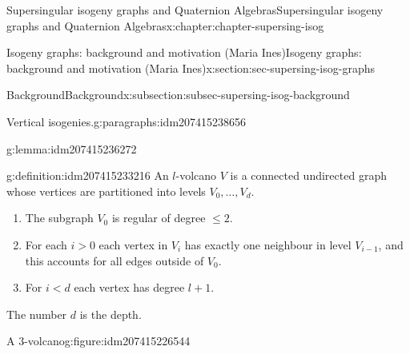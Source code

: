 \documentclass[oneside,10pt,]{book}
\numberwithin{equation}{section}
\newcommand{\lt}{<}
\newcommand{\gt}{>}
\begin{document}
\begin{chapterptx}{Supersingular isogeny graphs and Quaternion Algebras}{}{Supersingular isogeny graphs and Quaternion Algebras}{}{}{x:chapter:chapter-supersing-isog}
\begin{sectionptx}{Isogeny graphs: background and motivation (Maria Ines)}{}{Isogeny graphs: background and motivation (Maria Ines)}{}{}{x:section:sec-supersing-isog-graphs}
\begin{subsectionptx}{Background}{}{Background}{}{}{x:subsection:subsec-supersing-isog-background}
\begin{paragraphs}{Vertical isogenies.}{g:paragraphs:idm207415238656}
\begin{lemma}{}{}{g:lemma:idm207415236272}
\end{lemma}
\begin{definition}{}{g:definition:idm207415233216}%
An \(l\)-volcano \(V\) is a connected undirected graph whose vertices are partitioned into levels \(V_0, \ldots, V_d\).%
\begin{enumerate}
\item{}The subgraph \(V_0\) is regular of degree \(\le 2\).%
\item{}For each \(i \gt 0\) each vertex in \(V_i\) has exactly one neighbour in level \(V_{i-1}\), and this accounts for all edges outside of \(V_0\).%
\item{}For \(i \lt d\) each vertex has degree \(l+1\).%
\end{enumerate}
The number \(d\) is the depth.%
\end{definition}
\begin{figureptx}{A \(3\)-volcano}{g:figure:idm207415226544}{}%
\begin{image}{0}{1}{0}%
\end{image}
\end{figureptx}
\end{paragraphs}
\end{subsectionptx}
\end{sectionptx}
\end{chapterptx}
\end{document}
